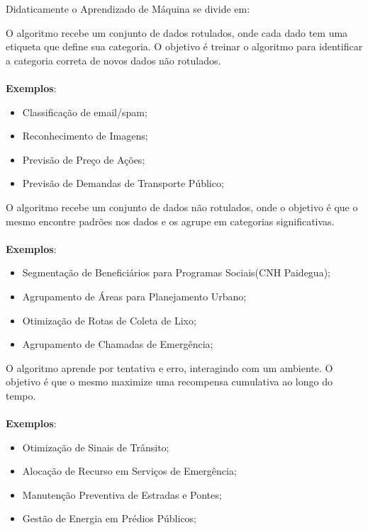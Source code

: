 Didaticamente o Aprendizado de Máquina se divide em:\vskip0.3cm


O algoritmo recebe um conjunto de dados rotulados, onde cada dado tem uma etiqueta que define sua categoria. O objetivo é treinar o algoritmo para identificar a categoria correta de novos dados não rotulados. 
    \\  
    \\
\textbf{Exemplos}: 
\begin{itemize}
\item Classificação de email/spam;
\item Reconhecimento de Imagens;
\item Previsão de Preço de Ações;
\item Previsão de Demandas de Transporte Público;
\end{itemize}

O algoritmo recebe um conjunto de dados não rotulados, onde o objetivo é que o mesmo encontre padrões nos dados e os agrupe em categorias significativas. 
\\ 
\\
\textbf{Exemplos}: 
\begin{itemize}
\item Segmentação de Beneficiários para Programas Sociais(CNH Paidegua);
\item Agrupamento de Áreas para Planejamento Urbano;
\item Otimização de Rotas de Coleta de Lixo;
\item Agrupamento de Chamadas de Emergência;
\end{itemize}


\newpage
{}

O algoritmo aprende por tentativa e erro, interagindo com um ambiente. O objetivo é que o mesmo maximize uma recompensa cumulativa ao longo do tempo.
\\
\\
\textbf{Exemplos}:
\begin{itemize}
\item Otimização de Sinais de Trânsito;
\item Alocação de Recurso em Serviços de Emergência;
\item Manutenção Preventiva de Estradas e Pontes;
\item Gestão de Energia em Prédios Públicos;
\end{itemize}

